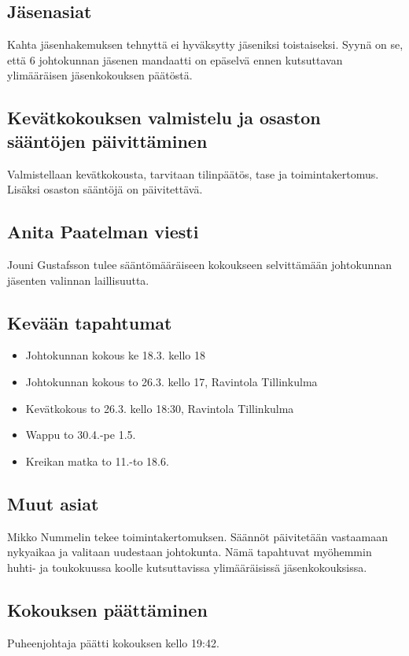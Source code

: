\documentclass[a4paper,12pt]{article}
\begin{document}
\subsection{Jäsenasiat}
Kahta jäsenhakemuksen tehnyttä ei hyväksytty jäseniksi toistaiseksi. Syynä on se, että 6 johtokunnan jäsenen mandaatti on epäselvä ennen kutsuttavan ylimääräisen jäsenkokouksen päätöstä.
\subsection{Kevätkokouksen valmistelu ja osaston sääntöjen päivittäminen}
Valmistellaan kevätkokousta, tarvitaan tilinpäätös, tase ja toimintakertomus. Lisäksi osaston sääntöjä on päivitettävä.
\subsection{Anita Paatelman viesti}
Jouni Gustafsson tulee sääntömääräiseen kokoukseen selvittämään johtokunnan jäsenten valinnan laillisuutta.
\subsection{Kevään tapahtumat}
\begin{itemize}
\item{Johtokunnan kokous} ke 18.3. kello 18
\item{Johtokunnan kokous} to 26.3. kello 17, Ravintola Tillinkulma
\item{Kevätkokous} to 26.3. kello 18:30, Ravintola Tillinkulma
\item{Wappu} to 30.4.-pe 1.5.
\item{Kreikan matka} to 11.-to 18.6.
\end{itemize}
\subsection{Muut asiat}
Mikko Nummelin tekee toimintakertomuksen. Säännöt päivitetään vastaamaan nykyaikaa ja valitaan uudestaan johtokunta. Nämä tapahtuvat myöhemmin huhti- ja toukokuussa koolle kutsuttavissa ylimääräisissä jäsenkokouksissa.
\subsection{Kokouksen päättäminen}
Puheenjohtaja päätti kokouksen kello 19:42.
\end{document}
